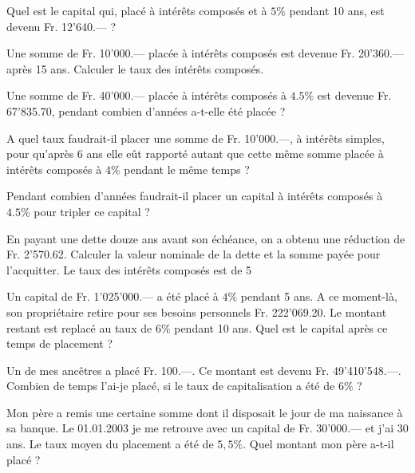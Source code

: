 \begin{exercice}
Quel est le capital qui, placé à intérêts composés et à $5 \%$ pendant 10 ans, est devenu Fr. 12'640.— ?
\end{exercice}

\begin{exercice}
Une somme de Fr. 10'000.— placée à intérêts composés est devenue Fr. 20'360.— après 15 ans. Calculer le taux des intérêts composés.
\end{exercice}

\begin{exercice}
Une somme de Fr. 40'000.— placée à intérêts composés à $4.5 \%$ est devenue Fr. 67'835.70, pendant combien d’années a-t-elle été placée ?		
\end{exercice}

\begin{exercice}
A quel taux faudrait-il placer une somme de Fr. 10'000.—, à intérêts simples, pour qu’après 6 ans elle eût rapporté autant que cette même somme placée à intérêts composés à $4 \%$ pendant le même temps ?	
\end{exercice}

\begin{exercice}
Pendant combien d’années faudrait-il placer un capital à intérêts composés à $4.5 \%$ pour tripler ce capital ?
\end{exercice}

\begin{exercice}
En payant une dette douze ans avant son échéance, on a obtenu une réduction de Fr. 2'570.62. Calculer la valeur nominale de la dette et la somme payée pour l’acquitter. Le taux des intérêts composés est de 5 %
\end{exercice}

\begin{exercice}
Un capital de Fr. 1'025'000.— a été placé à $4 \%$ pendant 5 ans. A ce moment-là, son propriétaire retire pour ses besoins personnels Fr. 222'069.20. Le montant restant est replacé au taux de $6 \%$ pendant 10 ans. 
Quel est le capital après ce temps de placement ?
\end{exercice}

\begin{exercice}
Un de mes ancêtres a placé Fr. 100.—. Ce montant est devenu Fr. 49'410'548.—. Combien de temps l’ai-je placé, si le taux de capitalisation a été de $6 \%$ ?
\end{exercice}

\begin{exercice}
Mon père a remis une certaine somme dont il disposait le jour de ma naissance à sa banque. Le 01.01.2003 je me retrouve avec un capital de Fr. 30'000.— et j’ai 30 ans. Le taux moyen du placement a été de $5,5 \%$.
Quel montant mon père a-t-il placé ?
\end{exercice}

